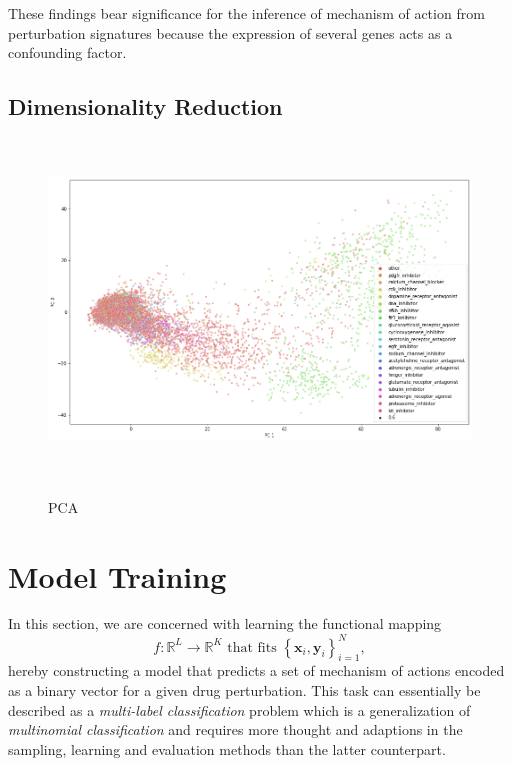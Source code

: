 \documentclass[bsc,frontabs,twoside,singlespacing,parskip,deptreport]{infthesis}     %
\let\Oldsection\section
\renewcommand{\section}{\FloatBarrier\Oldsection}
\begin{document}
These findings bear significance for the inference of mechanism of action from perturbation signatures because the expression of several genes acts as a confounding factor.


\section{Dimensionality Reduction}
\begin{figure}[h!]
\centering
\caption{PCA}
\includegraphics[height=9cm]{images/pca_labelled.png}\label{pca map}
\end{figure}


\chapter{Model Training}\label{model_training}
In this section, we are concerned with learning the functional mapping \[f: \mathbb{R}^{L} \rightarrow \mathbb{R}^{K} \text { that fits }\left\{\mathbf{x}_{i}, \mathbf{y}_{i}\right\}_{i=1}^{N},\] hereby constructing a model that predicts a set of mechanism of actions encoded as a binary vector for a given drug perturbation. 
This task can essentially be described as a \textit{multi-label classification} problem which is a generalization of \textit{multinomial classification} and requires more thought and adaptions in the sampling, learning and evaluation methods than the latter counterpart.\\
\end{document}
